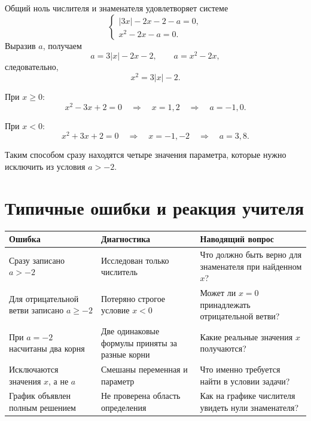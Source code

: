 Общий ноль числителя и знаменателя удовлетворяет системе
\[
  \begin{cases}
    |3x|-2x-2-a=0,\\
    x^2-2x-a=0.
  \end{cases}
\]
Выразив \(a\), получаем
\[
  a=3|x|-2x-2,
  \qquad
  a=x^2-2x,
\]
следовательно,
\[
  x^2=3|x|-2.
\]

При \(x\ge0\):
\[
  x^2-3x+2=0
  \quad\Longrightarrow\quad
  x=1,2
  \quad\Longrightarrow\quad
  a=-1,0.
\]

При \(x<0\):
\[
  x^2+3x+2=0
  \quad\Longrightarrow\quad
  x=-1,-2
  \quad\Longrightarrow\quad
  a=3,8.
\]

Таким способом сразу находятся четыре значения параметра, которые нужно
исключить из условия \(a>-2\).

\section{Типичные ошибки и реакция учителя}

\begin{center}
  \renewcommand{\arraystretch}{1.42}
  \begin{tabularx}{\textwidth}{
    >{\raggedright\arraybackslash}p{}
    >{\raggedright\arraybackslash}p{}
    >{\raggedright\arraybackslash}X}
    \toprule
    \rowcolor{TableHeader}
    Ошибка & Диагностика & Наводящий вопрос \\
    \midrule
    Сразу записано \(a>-2\)
      & Исследован только числитель
      & Что должно быть верно для знаменателя при найденном \(x\)? \\
    \addlinespace[0.2em]
    Для отрицательной ветви записано \(a\ge-2\)
      & Потеряно строгое условие \(x<0\)
      & Может ли \(x=0\) принадлежать отрицательной ветви? \\
    \addlinespace[0.2em]
    При \(a=-2\) насчитаны два корня
      & Две одинаковые формулы приняты за разные корни
      & Какие реальные значения \(x\) получаются? \\
    \addlinespace[0.2em]
    Исключаются значения \(x\), а не \(a\)
      & Смешаны переменная и параметр
      & Что именно требуется найти в условии задачи? \\
    \addlinespace[0.2em]
    График объявлен полным решением
      & Не проверена область определения
      & Как на графике числителя увидеть нули знаменателя? \\
    \bottomrule
  \end{tabularx}
\end{center}


